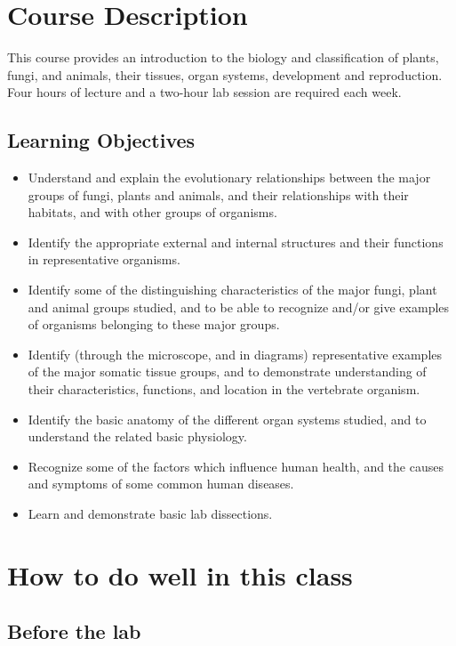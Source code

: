 \documentclass[]{book}
\theoremstyle{definition}
\theoremstyle{definition}
\theoremstyle{definition}
\theoremstyle{remark}
\begin{document}
\chapter{Course Description}\label{course-description}

This course provides an introduction to the biology and classification
of plants, fungi, and animals, their tissues, organ systems, development
and reproduction. Four hours of lecture and a two-hour lab session are
required each week.

\section{Learning Objectives}\label{learning-objectives}

\begin{itemize}
\item
  Understand and explain the evolutionary relationships between the
  major groups of fungi, plants and animals, and their relationships
  with their habitats, and with other groups of organisms.
\item
  Identify the appropriate external and internal structures and their
  functions in representative organisms.
\item
  Identify some of the distinguishing characteristics of the major
  fungi, plant and animal groups studied, and to be able to recognize
  and/or give examples of organisms belonging to these major groups.
\item
  Identify (through the microscope, and in diagrams) representative
  examples of the major somatic tissue groups, and to demonstrate
  understanding of their characteristics, functions, and location in the
  vertebrate organism.
\item
  Identify the basic anatomy of the different organ systems studied, and
  to understand the related basic physiology.
\item
  Recognize some of the factors which influence human health, and the
  causes and symptoms of some common human diseases.
\item
  Learn and demonstrate basic lab dissections.
\end{itemize}

\chapter{How to do well in this
class}\label{how-to-do-well-in-this-class}

\section*{Before the lab}\label{before-the-lab}
\end{document}
